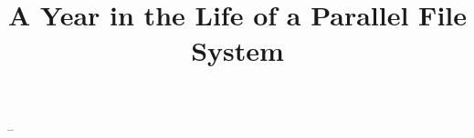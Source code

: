 --\documentclass[conference]{IEEEtran}
\begin{document}
\title{A Year in the Life of a Parallel File System}

\begin{comment}

\author{\IEEEauthorblockN{Glenn K. Lockwood, Teng Wang, Suren Byna, Nicholas J. Wright}
\IEEEauthorblockA{Lawrence Berkeley National Laboratory\\\{glock,tengwang,sbyna,njwright\}@lbl.gov
}
\and
\IEEEauthorblockN{Shane Snyder, Philip Carns}
\IEEEauthorblockA{Argonne National Laboratory\\
\{ssnyder,carns\}@mcs.anl.gov}
}
\end{comment}

\newcommand{\tokio}{TOKIO\xspace}
\newcommand{\tokiolong}{Total Knowledge of I/O\xspace}
\newcommand{\nersc}{NERSC\xspace}
\newcommand{\nersclong}{National Energy Research Scientific Computing Center\xspace}
\newcommand{\alcf}{ALCF\xspace}
\newcommand{\alcflong}{Argonne Leadership Computing Facility\xspace}
\newcommand{\cori}{Cori\xspace}
\newcommand{\edison}{Edison\xspace}
\newcommand{\mira}{Mira\xspace}
\newcommand{\mirafsone}{mira-fs1\xspace}
\newcommand{\scratchone}{scratch1\xspace}
\newcommand{\scratchtwo}{scratch2\xspace}
\newcommand{\scratchthree}{scratch3\xspace}
\newcommand{\cscratch}{cscratch\xspace}

\maketitle






















\end{document}
